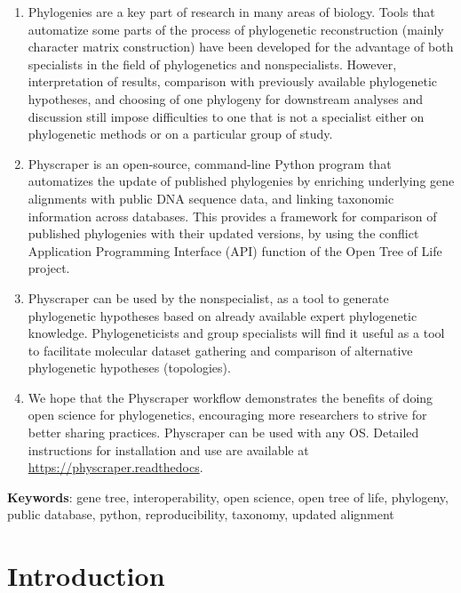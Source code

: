 \documentclass[]{article}
\begin{document}
\begin{enumerate}
\def\labelenumi{\arabic{enumi}.}
\item
  Phylogenies are a key part of research in many areas of biology. Tools that automatize
  some parts of the process of phylogenetic reconstruction (mainly character matrix construction)
  have been developed for the advantage of both specialists in the field of phylogenetics and nonspecialists.
  However, interpretation of results, comparison with previously available phylogenetic
  hypotheses, and choosing of one phylogeny for downstream analyses and discussion still impose difficulties
  to one that is not a specialist either on phylogenetic methods or on a particular group of study.
\item
  Physcraper is an open‐source, command-line Python program that automatizes the update of published
  phylogenies by enriching underlying gene alignments with public DNA sequence data, and linking taxonomic information across databases.
  This provides a framework for comparison of published phylogenies with their updated versions, by using the conflict Application Programming Interface (API) function of the Open Tree of Life project.
\item
  Physcraper can be used by the nonspecialist, as a tool to generate phylogenetic
  hypotheses based on already available expert phylogenetic knowledge.
  Phylogeneticists and group specialists will find it useful as a tool to facilitate molecular dataset gathering and comparison
  of alternative phylogenetic hypotheses (topologies).
\item
  We hope that the Physcraper workflow demonstrates the benefits of doing open science for phylogenetics, encouraging more researchers to strive for better sharing practices. Physcraper can be used with any OS. Detailed instructions for installation and
  use are available at \href{https://physcraper.readthedocs.io/en/tutorial/index.html}{https://physcraper.readthedocs}.
\end{enumerate}

\textbf{Keywords}: gene tree, interoperability, open science, open tree of life, phylogeny, public database, python, reproducibility, taxonomy, updated alignment

\newpage

\hypertarget{introduction}{%
\section{Introduction}\label{introduction}}
\end{document}

